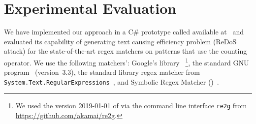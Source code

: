 \documentclass[acmsmall,screen]{acmart}
\newif\ifTR
\begin{document}
%
%

\section{Experimental Evaluation}\label{sec:experiments}
\vspace{-0.5mm}

We have implemented our approach in a C\#
prototype called \catool
available at~
and evaluated its capability of generating text causing efficiency problem (ReDoS attack)
for the state-of-the-art regex matchers on patterns that use the counting operator.
We use the following matchers':
Google's \retwo library~\cite{re2}%
\footnote{%
  We used the version 2019-01-01 of \retwo via the command line interface \texttt{re2g} from
  \url{https://github.com/akamai/re2g}.
}, 
%
the standard GNU \grep program~\cite{grep} (version~3.3),
%
the \dotnet standard library regex matcher from
\texttt{System.Text.RegularExpressions}~\cite{dotnet}, 
%
and Symbolic Regex Matcher (\srm)~\cite{VSXW19}.
\end{document}
